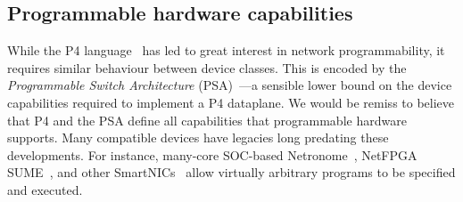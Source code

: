 \documentclass[
sigconf,natbib=false
]{acmart}
\begin{document}
\subsection{Programmable hardware capabilities}



While the P4 language~\parencite{DBLP:journals/ccr/BosshartDGIMRSTVVW14} has led to great interest in network programmability, it requires similar behaviour between device classes.
This is encoded by the \emph{Programmable Switch Architecture} (PSA)~\parencite{p4-psa}---a sensible lower bound on the device capabilities required to implement a P4 dataplane.
We would be remiss to believe that P4 and the PSA define all capabilities that programmable hardware supports.
Many compatible devices have legacies long predating these developments. 
For instance, many-core SOC-based Netronome~\parencite{netronome-smartnic}, NetFPGA SUME~\parencite{DBLP:journals/micro/ZilbermanACM14,DBLP:conf/fpga/IbanezBMZ19}, and other SmartNICs~\parencite{nvidia-bluefield,xilinx-alveo} allow virtually arbitrary programs to be specified and executed.
\end{document}
